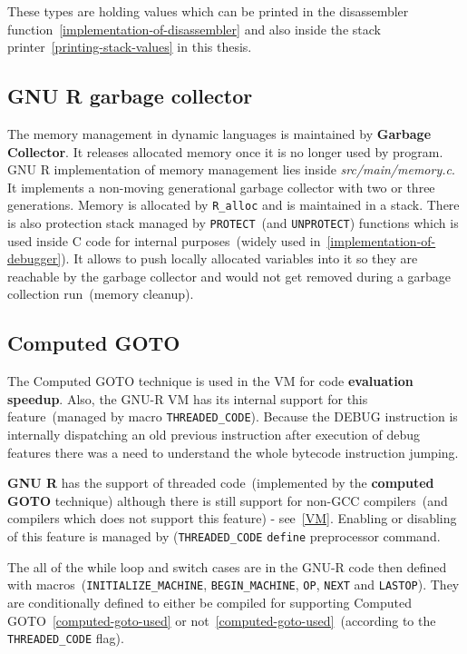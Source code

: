 \documentclass[thesis=M,english]{FITthesis}[2018/10/20]
\newcommand{\code}[1]{\texttt{#1}}
\begin{document}
These types are holding values which can be printed in the disassembler function~\ref{implementation-of-disassembler} and also inside the stack printer~\ref{printing-stack-values} in this thesis.

\subsection{GNU R garbage collector}\label{GC}

The memory management in dynamic languages is maintained by  \textbf{Garbage Collector}. It releases allocated memory once it is no longer used by program. GNU R implementation of memory management lies inside \textit{src/main/memory.c}. It implements a non-moving generational garbage collector with two or three generations. Memory is allocated by \code{R{\_}alloc} and is maintained in a stack. There is also protection stack managed by \code{PROTECT}~(and \code{UNPROTECT}) functions which is used inside C code for internal purposes~(widely used in~\ref{implementation-of-debugger}). It allows to push locally allocated variables into it so they are reachable by the garbage collector and would not get removed during a garbage collection run~(memory cleanup).

\subsection{Computed GOTO}\label{Computed-GOTO}

The Computed GOTO technique is used in the VM for code \textbf{evaluation speedup}. Also, the GNU-R VM has its internal support for this feature~(managed by macro \code{THREADED{\_}CODE}). Because the DEBUG instruction is internally dispatching an old previous instruction after execution of debug features there was a need to understand the whole bytecode instruction jumping.

\textbf{GNU R} has the support of threaded code~(implemented by the \textbf{computed GOTO} technique) although there is still support for non-GCC compilers~(and compilers which does not support this feature) - see~\ref{VM}. Enabling or disabling of this feature is managed by (\code{THREADED{\_}CODE} \code{define} preprocessor command.

The all of the while loop and switch cases are in the GNU-R code then defined with macros~(\code{INITIALIZE{\_}MACHINE}, \code{BEGIN{\_}MACHINE}, \code{OP}, \code{NEXT} and \code{LASTOP}). They are conditionally defined to either be compiled for supporting Computed GOTO~\ref{computed-goto-used} or not~\ref{computed-goto-used}~(according to the \code{THREADED{\_}CODE} flag).
\end{document}
